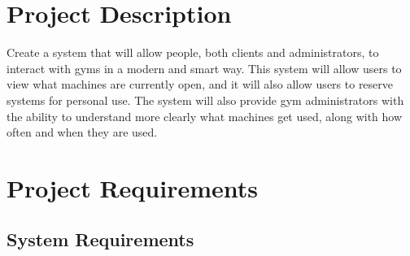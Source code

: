\documentclass[letterpaper,11pt]{./templates/texMemo} %
\begin{document}
\maketitle 

\section{Project Description}

Create a system that will allow people, both clients and administrators, to interact with gyms in a modern and smart way. This system will allow users to view what machines are currently open, and it will also allow users to reserve systems for personal use. The system will also provide gym administrators with the ability to understand more clearly what machines get used, along with how often and when they are used.

\section{Project Requirements}

\subsection{System Requirements}
\end{document}
